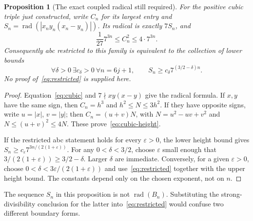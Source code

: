 \documentclass[11pt]{article}
\newtheorem{proposition}[theorem]{Proposition}
\theoremstyle{definition}
\theoremstyle{remark}
\newcommand{\rad}{\operatorname{rad}}
\begin{document}
\begin{proposition}[The exact coupled radical still required]\label{prop:coupled}
For the positive cubic triple just constructed, write $C_n$ for its largest entry and $S_n=\rad(|x_ny_n(x_n-y_n)|)$. Its radical is exactly $7S_n$, and
\begin{equation}\label{eq:cubic-height}
\frac1{27}7^{3n}\le C_n^2\le4\cdot7^{3n}.
\end{equation}
Consequently abc restricted to this family is equivalent to the collection of lower bounds
\begin{equation}\label{eq:restricted}
\forall\delta>0\ \exists c_\delta>0\ \forall n=6j+1,\qquad
S_n\ge c_\delta7^{(3/2-\delta)n}.
\end{equation}
No proof of~\eqref{eq:restricted} is supplied here.
\end{proposition}
\begin{proof}
Equation~\eqref{eq:cubic} and $7\nmid xy(x-y)$ give the radical formula. If $x,y$ have the same sign, then $C_n=h^3$ and $h^2\le N\le3h^2$. If they have opposite signs, write $u=|x|$, $v=|y|$; then $C_n=(u+v)N$, with
$N=u^2-uv+v^2$ and $N\le(u+v)^2\le4N$. These prove~\eqref{eq:cubic-height}.

If the restricted abc statement holds for every $\varepsilon>0$, the lower height bound gives
$S_n\ge c_\varepsilon7^{3n/(2(1+\varepsilon))}$. For any $0<\delta<3/2$, choose $\varepsilon$ small enough that $3/(2(1+\varepsilon))\ge3/2-\delta$. Larger $\delta$ are immediate. Conversely, for a given $\varepsilon>0$, choose $0<\delta<3\varepsilon/(2(1+\varepsilon))$ and use~\eqref{eq:restricted} together with the upper height bound. The constants depend only on the chosen exponent, not on $n$.
\end{proof}
The sequence $S_n$ in this proposition is not $\rad(B_n)$. Substituting the strong-divisibility conclusion for the latter into~\eqref{eq:restricted} would confuse two different boundary forms.
\end{document}
